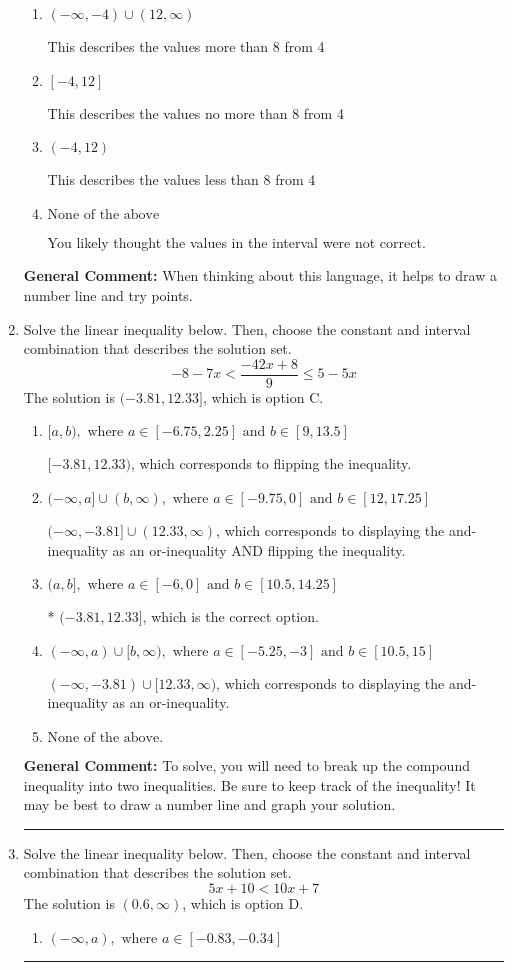 \documentclass{extbook}[14pt]
\newcommand{\litem}[1]{\item #1

\rule{\textwidth}{0.4pt}}
\begin{document}
\begin{enumerate}
{\begin{enumerate}[label=\Alph*.]
This describes the values no less than 8 from 4
\item \( (-\infty, -4) \cup (12, \infty) \)

This describes the values more than 8 from 4
\item \( [-4, 12] \)

This describes the values no more than 8 from 4
\item \( (-4, 12) \)

This describes the values less than 8 from 4
\item \( \text{None of the above} \)

You likely thought the values in the interval were not correct.
\end{enumerate}

\textbf{General Comment:} When thinking about this language, it helps to draw a number line and try points.
}
\litem{
Solve the linear inequality below. Then, choose the constant and interval combination that describes the solution set.
\[ -8 - 7 x < \frac{-42 x + 8}{9} \leq 5 - 5 x \]The solution is \( (-3.81, 12.33] \), which is option C.\begin{enumerate}[label=\Alph*.]
\item \( [a, b), \text{ where } a \in [-6.75, 2.25] \text{ and } b \in [9, 13.5] \)

$[-3.81, 12.33)$, which corresponds to flipping the inequality.
\item \( (-\infty, a] \cup (b, \infty), \text{ where } a \in [-9.75, 0] \text{ and } b \in [12, 17.25] \)

$(-\infty, -3.81] \cup (12.33, \infty)$, which corresponds to displaying the and-inequality as an or-inequality AND flipping the inequality.
\item \( (a, b], \text{ where } a \in [-6, 0] \text{ and } b \in [10.5, 14.25] \)

* $(-3.81, 12.33]$, which is the correct option.
\item \( (-\infty, a) \cup [b, \infty), \text{ where } a \in [-5.25, -3] \text{ and } b \in [10.5, 15] \)

$(-\infty, -3.81) \cup [12.33, \infty)$, which corresponds to displaying the and-inequality as an or-inequality.
\item \( \text{None of the above.} \)


\end{enumerate}

\textbf{General Comment:} To solve, you will need to break up the compound inequality into two inequalities. Be sure to keep track of the inequality! It may be best to draw a number line and graph your solution.
}
\litem{
Solve the linear inequality below. Then, choose the constant and interval combination that describes the solution set.
\[ 5x + 10 < 10x + 7 \]The solution is \( (0.6, \infty) \), which is option D.\begin{enumerate}[label=\Alph*.]
\item \( (-\infty, a), \text{ where } a \in [-0.83, -0.34] \)


\end{enumerate}}
\end{enumerate}
\end{document}
